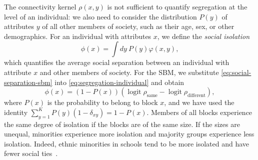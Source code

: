 \documentclass{scrartcl}
\DeclareMathOperator{\logit}{logit}
\begin{document}
The connectivity kernel $\rho(x, y)$ is not sufficient to quantify segregation at the level of an individual: we also need to consider the distribution $P(y)$ of attributes $y$ of all other members of society, such as their age, sex, or other demographics. For an individual with attributes $x$, we define the \emph{social isolation}
\begin{equation}
    \phi(x) = \int dy \ P(y) \varphi(x, y),\label{eq:segregation-individual}
\end{equation}
which quantifies the average social separation between an individual with attribute $x$ and other members of society. For the SBM, we substitute \cref{eq:social-separation-sbm} into \cref{eq:segregation-individual} and obtain
\begin{equation}
    \phi(x) = (1-P(x))\left(\logit\rho_\mathrm{same}-\logit\rho_\mathrm{different}\right),\label{eq:segregation-individual-sbm}
\end{equation}
where $P(x)$ is the probability to belong to block $x$, and we have used the identity $\sum_{y=1}^K P(y)\left(1-\delta_{xy}\right)= 1 - P(x)$. Members of all blocks experience the same degree of isolation if the blocks are of the same size. If the sizes are unequal, minorities experience more isolation and majority groups experience less isolation. Indeed, ethnic minorities in schools tend to be more isolated and have fewer social ties~\cite{Currarini2009}.
\end{document}
